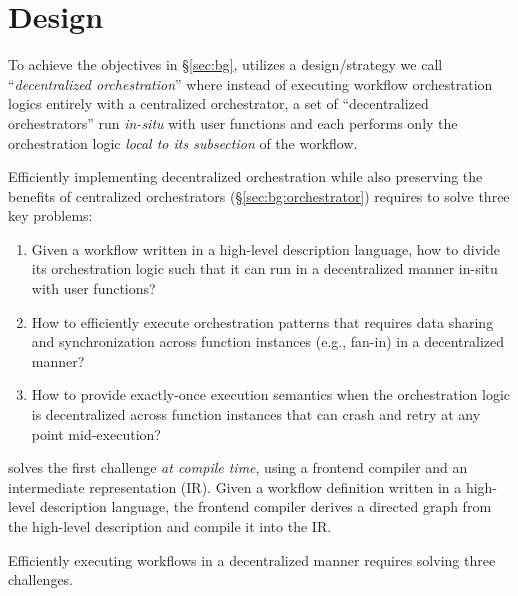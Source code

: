 \section{Design}

To achieve the objectives in \S\ref{sec:bg}, \name{} utilizes a
design/strategy we call ``\emph{decentralized orchestration}'' where instead
of executing workflow orchestration logics entirely with a centralized
orchestrator, a set of ``decentralized orchestrators'' run \emph{in-situ} with
user functions and each performs only the orchestration logic \emph{local to
its subsection} of the workflow.

Efficiently implementing decentralized orchestration while also preserving the
benefits of centralized orchestrators (\S\ref{sec:bg:orchestrator}) requires
\name{} to solve three key problems:

\begin{enumerate}

	\item Given a workflow written in a high-level description language, how
	to divide its orchestration logic such that it can run in a decentralized
	manner in-situ with user functions?

	\item How to efficiently execute orchestration patterns that requires data
	sharing and synchronization across function instances (e.g., fan-in) in a
	decentralized manner?

	\item How to provide exactly-once execution semantics when the
	orchestration logic is decentralized across function instances that can
	crash and retry at any point mid-execution?

\end{enumerate}

\name{} solves the first challenge \emph{at compile time}, using a frontend
compiler and an intermediate representation (IR). Given a workflow definition
written in a high-level description language, the frontend compiler derives a
directed graph from the high-level description and compile it into the \name{}
IR.











Efficiently executing workflows in a
decentralized manner requires solving three challenges.

